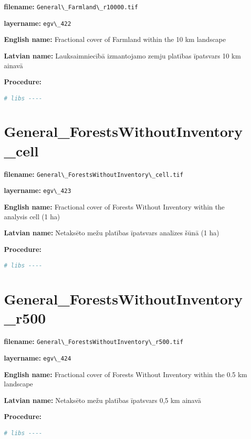 \documentclass[
]{book}
\newcommand{\passthrough}[1]{#1}
\begin{document}
\textbf{filename:} \passthrough{\lstinline!General\_Farmland\_r10000.tif!}

\textbf{layername:} \passthrough{\lstinline!egv\_422!}

\textbf{English name:} Fractional cover of Farmland within the 10 km landscape

\textbf{Latvian name:} Lauksaimniecībā izmantojamo zemju platības īpatsvars 10 km ainavā

\textbf{Procedure:}

\begin{lstlisting}[language=R]
# libs ----
\end{lstlisting}

\section{General\_ForestsWithoutInventory\_cell}\label{ch06.423}

\textbf{filename:} \passthrough{\lstinline!General\_ForestsWithoutInventory\_cell.tif!}

\textbf{layername:} \passthrough{\lstinline!egv\_423!}

\textbf{English name:} Fractional cover of Forests Without Inventory within the analysis cell (1 ha)

\textbf{Latvian name:} Netaksēto mežu platības īpatsvars analīzes šūnā (1 ha)

\textbf{Procedure:}

\begin{lstlisting}[language=R]
# libs ----
\end{lstlisting}

\section{General\_ForestsWithoutInventory\_r500}\label{ch06.424}

\textbf{filename:} \passthrough{\lstinline!General\_ForestsWithoutInventory\_r500.tif!}

\textbf{layername:} \passthrough{\lstinline!egv\_424!}

\textbf{English name:} Fractional cover of Forests Without Inventory within the 0.5 km landscape

\textbf{Latvian name:} Netaksēto mežu platības īpatsvars 0,5 km ainavā

\textbf{Procedure:}

\begin{lstlisting}[language=R]
# libs ----
\end{lstlisting}
\end{document}
